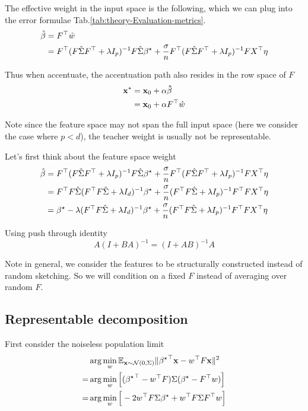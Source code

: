 The effective weight in the input space is the following, which we
can plug into the error formulae Tab.\ref{tab:theory-Evaluation-metrics}.
\begin{align*}
\hat{\beta} & =F^{\top}\hat{w}\\
 & =F^{\top}(F\hat{\Sigma}F^{\top}+\lambda I_{p})^{-1}F\hat{\Sigma}{\beta^{\star}}+\frac{\sigma}{n}F^{\top}(F\hat{\Sigma}F^{\top}+\lambda I_{p})^{-1}FX^{\top}\eta
\end{align*}

Thus when accentuate, the accentuation path also resides in the row
space of $F$
\begin{align*}
\mathbf{x}^{*} & =\mathbf{x}_{0}+\alpha\mathbf{\hat{\beta}}\\
 & =\mathbf{x}_{0}+\alpha F^{\top}\hat{w}
\end{align*}

Note since the feature space may not span the full input space (here
we consider the case where $p<d$), the teacher weight is usually
not be representable.

Let's first think about the feature space weight
\begin{align*}
\hat{\beta} & =F^{\top}(F\hat{\Sigma}F^{\top}+\lambda I_{p})^{-1}F\hat{\Sigma}{\beta^{\star}}+\frac{\sigma}{n}F^{\top}(F\hat{\Sigma}F^{\top}+\lambda I_{p})^{-1}FX^{\top}\eta\\
 & =F^{\top}F\hat{\Sigma}(F^{\top}F\hat{\Sigma}+\lambda I_{d})^{-1}{\beta^{\star}}+\frac{\sigma}{n}(F^{\top}F\hat{\Sigma}+\lambda I_{p})^{-1}F^{\top}FX^{\top}\eta\\
 & ={\beta^{\star}}-\lambda(F^{\top}F\hat{\Sigma}+\lambda I_{d})^{-1}{\beta^{\star}}+\frac{\sigma}{n}(F^{\top}F\hat{\Sigma}+\lambda I_{p})^{-1}F^{\top}FX^{\top}\eta
\end{align*}

Using push through identity
\[
A(I+BA)^{-1}=(I+AB)^{-1}A
\]

Note in general, we consider the features to be structurally constructed
instead of random sketching. So we will condition on a fixed $F$
instead of averaging over random $F$.

\subsection{Representable decomposition}

First consider the noiseless population limit
\begin{align*}
 & \arg\min_{w}\mathbb{E}_{\mathbf{x}\sim\mathcal{N}(0,\Sigma)}\|{{\beta^{\star}}}^{\top}\mathbf{x}-w^{\top}F\mathbf{x}\|^{2}\\
= & \arg\min_{w}\Big[({{\beta^{\star}}}^{\top}-w^{\top}F)\Sigma({\beta^{\star}}-F^{\top}w)\Big]\\
= & \arg\min_{w}\Big[-2w^{\top}F\Sigma{\beta^{\star}}+w^{\top}F\Sigma F^{\top}w\Big]
\end{align*}

